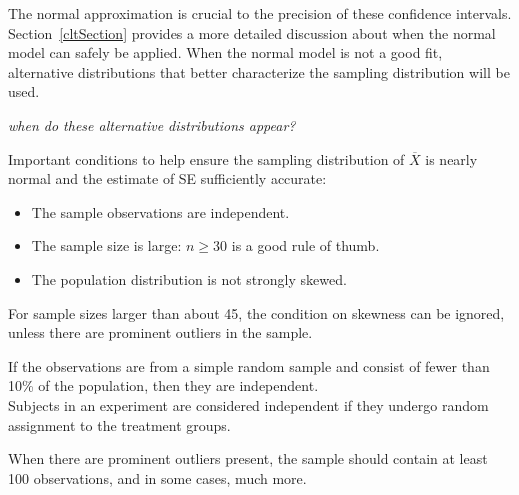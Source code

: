 \begin{spacing}{1.5}
The normal approximation is crucial to the precision of these confidence intervals. Section~\ref{cltSection} provides a more detailed discussion about when the normal model can safely be applied. When the normal model is not a good fit,  alternative distributions that better characterize the sampling distribution will be used.

\textit{when do these alternative distributions appear?}

\begin{termBox}{
Important conditions to help ensure the sampling distribution of $\overline{X}$ is nearly normal and the estimate of SE sufficiently accurate:
\begin{itemize}
\setlength{\itemsep}{0mm}
\item The sample observations are independent.
\item The sample size is large: $n\geq30$ is a good rule of thumb.
\item The population distribution is not strongly skewed. 
\end{itemize}
For sample sizes larger than about 45, the condition on skewness can be ignored, unless there are prominent outliers in the sample. }
\end{termBox}

\begin{tipBox}{
If the observations are from a simple random sample and consist of fewer than 10\% of the population, then they are independent.\\[2mm]
Subjects in an experiment are considered independent if they undergo random assignment to the treatment groups. \\[2mm]
}
\end{tipBox}

\begin{tipBox}{
When there are prominent outliers present, the sample should contain at least 100 observations, and in some cases, much more. \\[2mm]
}
\end{tipBox}


\end{spacing}
